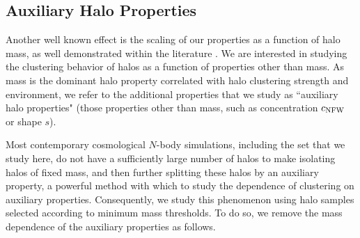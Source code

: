 \documentclass[usenatbib,usegraphicx,letterpaper]{mn2e}
\begin{document}
\subsection{Auxiliary Halo Properties}

Another well known effect is the scaling of our properties as a function of halo mass, as well demonstrated
within the literature \citep{allgood06, duffy08, despali16}. We are interested in studying the clustering behavior of halos
as a function of properties other than mass. As mass is the dominant halo property correlated with halo
clustering strength and environment, we refer to the additional properties that we study as 
``auxiliary halo properties" (those properties other than mass, such as concentration $c_{\rm NFW}$ or shape
$s$). 

Most contemporary cosmological $N$-body simulations, including the set that we study here, 
do not have a sufficiently large number of halos to make isolating halos of fixed mass, and then further 
splitting these halos by an auxiliary property, a powerful method with which to study the dependence of 
clustering on auxiliary properties. Consequently, we study this phenomenon using halo samples 
selected according to minimum mass thresholds. To do so, we remove the mass dependence of 
the auxiliary properties as follows. 
\end{document}
